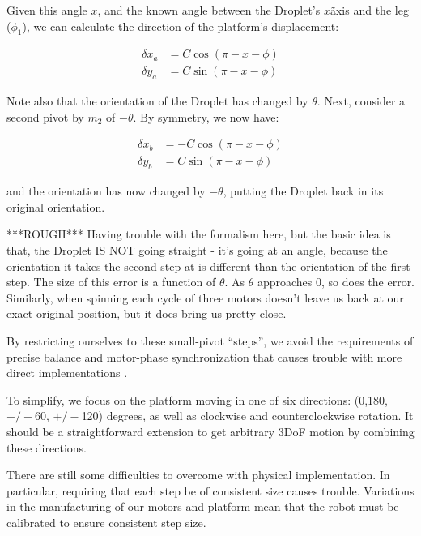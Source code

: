 \documentclass[letterpaper, 10pt, conference]{ieeeconf}
\begin{document}
Given this angle $x$, and the known angle between the Droplet's $x$\~axis and the leg ($\phi_1$), we can calculate the direction of the platform's displacement:

\begin{align}
\delta x_a &= C \cos(\pi - x - \phi)\\
\nonumber
\delta y_a &= C \sin(\pi - x - \phi)
\end{align}

Note also that the orientation of the Droplet has changed by $\theta$. Next, consider a second pivot by $m_2$ of $-\theta$. By symmetry, we now have:

\begin{align}
\delta x_b &= -C\cos(\pi -x -\phi)\\
\nonumber
\delta y_b &= C \sin(\pi - x - \phi)
\end{align}

and the orientation has now changed by $-\theta$, putting the Droplet back in its original orientation. 

***ROUGH***
Having trouble with the formalism here, but the basic idea is that, the Droplet IS NOT going straight - it's going at an angle, because the orientation it takes the second step at is different than the orientation of the first step. The size of this error is a function of $\theta$. As $\theta$ approaches $0$, so does the error. Similarly, when spinning each cycle of three motors doesn't leave us back at our exact original position, but it does bring us pretty close.

By restricting ourselves to these small-pivot ``steps'', we avoid the requirements of precise balance and motor-phase synchronization that causes trouble with more direct implementations \cite{Vartholomeos2006}.

To simplify, we focus on the platform moving in one of six directions: (0,180, $+/-$60, $+/-$120) degrees, as well as clockwise and counterclockwise rotation. It should be a straightforward extension to get arbitrary 3DoF motion by combining these directions.

There are still some difficulties to overcome with physical implementation. In particular, requiring that each step be of consistent size causes trouble. Variations in the manufacturing of our motors and platform mean that the robot must be calibrated to ensure consistent step size.
\end{document}
